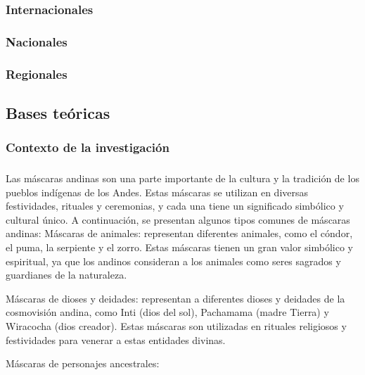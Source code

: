 \documentclass[12pt,a4paper]{article}
\begin{document}
\subsubsection{Internacionales}


\subsubsection{Nacionales}

\subsubsection{Regionales}

\subsection{Bases teóricas}
\subsubsection{Contexto de la investigación}

\subsubsection{\variablei}%

Las máscaras andinas son una parte importante de la cultura y la tradición de los pueblos indígenas de los Andes. Estas máscaras se utilizan en diversas festividades, rituales y ceremonias, y cada una tiene un significado simbólico y cultural único. A continuación, se presentan algunos tipos comunes de máscaras andinas:
	Máscaras de animales: representan diferentes animales, como el cóndor, el puma, la serpiente y el zorro. Estas máscaras tienen un gran valor simbólico y espiritual, ya que los andinos consideran a los animales como seres sagrados y guardianes de la naturaleza.

	Máscaras de dioses y deidades: representan a diferentes dioses y deidades de la cosmovisión andina, como Inti (dios del sol), Pachamama (madre Tierra) y Wiracocha (dios creador). Estas máscaras son utilizadas en rituales religiosos y festividades para venerar a estas entidades divinas.

	Máscaras de personajes ancestrales: %
\end{document}
